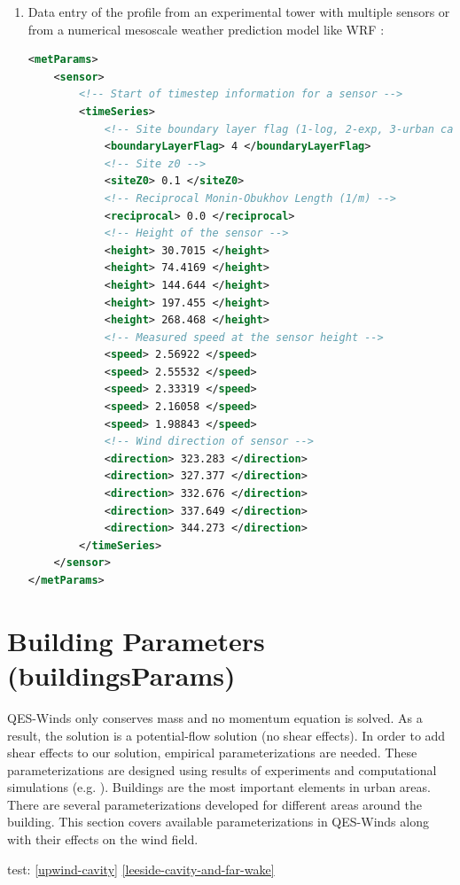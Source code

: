 \begin{enumerate}
\item Data entry of the profile from an experimental tower with multiple sensors or from a numerical mesoscale weather prediction model like WRF \cite{powers2017weather}:

\begin{lstlisting}[language=XML]
<metParams>
	<sensor>
		<!-- Start of timestep information for a sensor -->
		<timeSeries>						
			<!-- Site boundary layer flag (1-log, 2-exp, 3-urban canopy, 4-data entry) -->    
			<boundaryLayerFlag> 4 </boundaryLayerFlag>
			<!-- Site z0 -->
			<siteZ0> 0.1 </siteZ0>
			<!-- Reciprocal Monin-Obukhov Length (1/m) --> 									
			<reciprocal> 0.0 </reciprocal>
			<!-- Height of the sensor -->
			<height> 30.7015 </height>
			<height> 74.4169 </height>
			<height> 144.644 </height>
			<height> 197.455 </height>
			<height> 268.468 </height>
			<!-- Measured speed at the sensor height -->
			<speed> 2.56922 </speed> 							
			<speed> 2.55532 </speed>
			<speed> 2.33319 </speed>
			<speed> 2.16058 </speed>
			<speed> 1.98843 </speed>
			<!-- Wind direction of sensor -->
			<direction> 323.283 </direction> 					
			<direction> 327.377 </direction>
			<direction> 332.676 </direction>
			<direction> 337.649 </direction>
			<direction> 344.273 </direction>
		</timeSeries>
	</sensor>
</metParams>
\end{lstlisting}

\end{enumerate}

\section{Building Parameters (buildingsParams)}

QES-Winds only conserves mass and no momentum equation is solved. As a result, the solution is a potential-flow solution (no shear effects). In order to add shear effects to our solution, empirical parameterizations are needed. These parameterizations are designed using results of experiments and computational simulations (e.g. \cite{singh2008evaluation,brown2013quic}). Buildings are the most important elements in urban areas. There are several parameterizations developed for different areas around the building. This section covers available parameterizations in QES-Winds along with their effects on the wind field.

test: \autoref{upwind-cavity} \autoref{leeside-cavity-and-far-wake}

